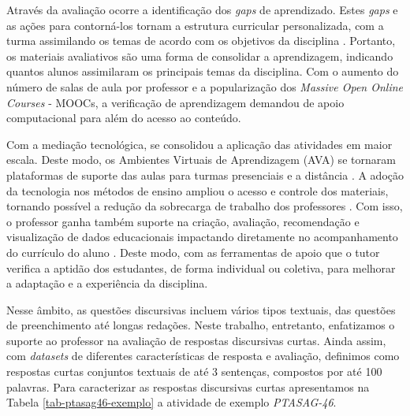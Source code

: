 Através da avaliação ocorre a identificação dos \textit{gaps} de aprendizado. Estes \textit{gaps} e as ações para contorná-los tornam a estrutura curricular personalizada, com a turma assimilando os temas de acordo com os objetivos da disciplina \cite{biggs1998}. Portanto, os materiais avaliativos são uma forma de consolidar a aprendizagem, indicando quantos alunos assimilaram os principais temas da disciplina. Com o aumento do número de salas de aula por professor e a popularização dos \textit{Massive Open Online Courses} - MOOCs, a verificação de aprendizagem demandou de apoio computacional para além do acesso ao conteúdo. 

Com a mediação tecnológica, se consolidou a aplicação das atividades em maior escala. Deste modo, os Ambientes Virtuais de Aprendizagem (AVA) \cite{maquine2020} se tornaram plataformas de suporte das aulas para turmas presenciais e a distância \cite{raes2020}. A adoção da tecnologia nos métodos de ensino ampliou o acesso e controle dos materiais, tornando possível a redução da sobrecarga de trabalho dos professores \cite{dunlap2005}. Com isso, o professor ganha também suporte na criação, avaliação, recomendação e visualização de dados educacionais impactando diretamente no acompanhamento do currículo do aluno \cite{paiva2012}. Deste modo, com as ferramentas de apoio que o tutor verifica a aptidão dos estudantes, de forma individual ou coletiva, para melhorar a adaptação e a experiência da disciplina.

Nesse âmbito, as questões discursivas incluem vários tipos textuais, das questões de preenchimento até longas redações. Neste trabalho, entretanto, enfatizamos o suporte ao professor na avaliação de respostas discursivas curtas. Ainda assim, com \textit{datasets} de diferentes características de resposta e avaliação, definimos como respostas curtas conjuntos textuais de até 3 sentenças, compostos por até 100 palavras. Para caracterizar as respostas discursivas curtas apresentamos na Tabela \ref{tab-ptasag46-exemplo} a atividade de exemplo \textit{PTASAG-46}.

